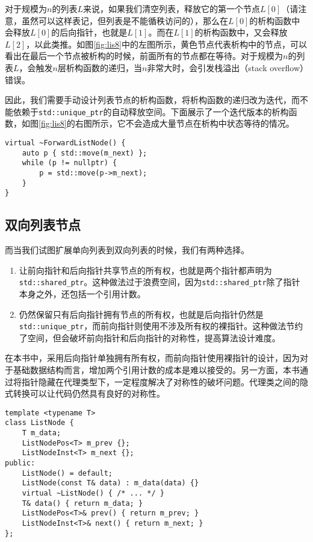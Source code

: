 对于规模为$n$的列表$L$来说，如果我们清空列表，释放它的第一个节点$L[0]$（请注意，虽然可以这样表记，但列表是不能循秩访问的），那么在$L[0]$的析构函数中会释放$L[0]$的后向指针，也就是$L[1]$。而在$L[1]$的析构函数中，又会释放$L[2]$，以此类推。如图\ref{fig:lis8}中的左图所示，黄色节点代表析构中的节点，可以看出在最后一个节点被析构的时候，前面所有的节点都在等待。对于规模为$n$的列表$L$，会触发$n$层析构函数的递归，当$n$非常大时，会引发栈溢出（stack overflow）错误。

因此，我们需要手动设计列表节点的析构函数，将析构函数的递归改为迭代，而不能依赖于\lstinline{std::unique_ptr}的自动释放空间。下面展示了一个迭代版本的析构函数，如图\ref{fig:lis8}的右图所示，它不会造成大量节点在析构中状态等待的情况。

\begin{lstlisting}
virtual ~ForwardListNode() {
    auto p { std::move(m_next) };
    while (p != nullptr) {
        p = std::move(p->m_next);
    }
}
\end{lstlisting}

\subsection{双向列表节点}

而当我们试图扩展单向列表到双向列表的时候，我们有两种选择。
\begin{enumerate}
    \item 让前向指针和后向指针共享节点的所有权，也就是两个指针都声明为\lstinline{std::shared_ptr}。这种做法过于浪费空间，因为\lstinline{std::shared_ptr}除了指针本身之外，还包括一个引用计数。
    \item 仍然保留只有后向指针拥有节点的所有权，也就是后向指针仍然是\lstinline{std::unique_ptr}，而前向指针则使用不涉及所有权的裸指针。这种做法节约了空间，但会破坏前向指针和后向指针的对称性，提高算法设计难度。
\end{enumerate}

在本书中，采用后向指针单独拥有所有权，而前向指针使用裸指针的设计，因为对于基础数据结构而言，增加两个引用计数的成本是难以接受的。另一方面，本书通过将指针隐藏在代理类型下，一定程度解决了对称性的破坏问题。代理类之间的隐式转换可以让代码仍然具有良好的对称性。

\begin{lstlisting}
template <typename T>
class ListNode {
    T m_data;
    ListNodePos<T> m_prev {};
    ListNodeInst<T> m_next {};
public:
    ListNode() = default;
    ListNode(const T& data) : m_data(data) {}
    virtual ~ListNode() { /* ... */ }
    T& data() { return m_data; }
    ListNodePos<T>& prev() { return m_prev; }
    ListNodeInst<T>& next() { return m_next; }
};
\end{lstlisting}

